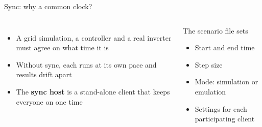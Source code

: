 \documentclass[aspectratio=169,11pt]{beamer}
\begin{document}
\begin{frame}{Sync: why a common clock?}
  \begin{columns}[c]
    \begin{itemize}
      \item A grid simulation, a controller and a real inverter must agree on \alert{what time it is}
      \item Without sync, each runs at its own pace and results drift apart
      \item The \textbf{sync host} is a stand-alone client that keeps everyone on one time
    \end{itemize}
    \begin{block}{The scenario file sets}
      \begin{itemize}
        \item Start and end time
        \item Step size
        \item Mode: simulation or emulation
        \item Settings for each participating client
      \end{itemize}
    \end{block}
  \end{columns}
\end{frame}
\end{document}
